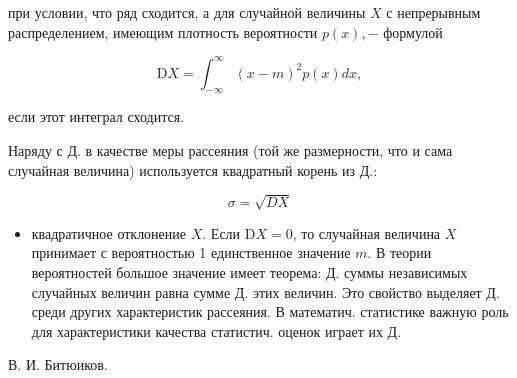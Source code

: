 \documentclass[10pt]{article}
\begin{document}
при условии, что ряд сходится, а для случайной величины $X$ с непрерывным распределением, имеющим плотность вероятности $p(x),-$ формулой



\[

\mathrm{D} X=\int_{-\infty}^{\infty}(x-m)^{2} p(x) d x,

\]



если этот интеграл сходится.



Наряду с Д. в качестве меры рассеяния (той же размерности, что и сама случайная величина) используется квадратный корень из Д.:



\[

\sigma=\sqrt{D X}

\]



\begin{itemize}

  \item квадратичное отклонение $X$. Если $\mathrm{D} X=0$, то случайная величина $X$ принимает с вероятностью 1 единственное значение $m$. В теории вероятностей большое значение имеет теорема: Д. суммы независимых случайных величин равна сумме Д. этих величин. Это свойство выделяет Д. среди других характеристик рассеяния. В математич. статистике важную роль для характеристики качества статистич. оценок играет их Д.

\end{itemize}



В. И. Битюиков.
\end{document}
